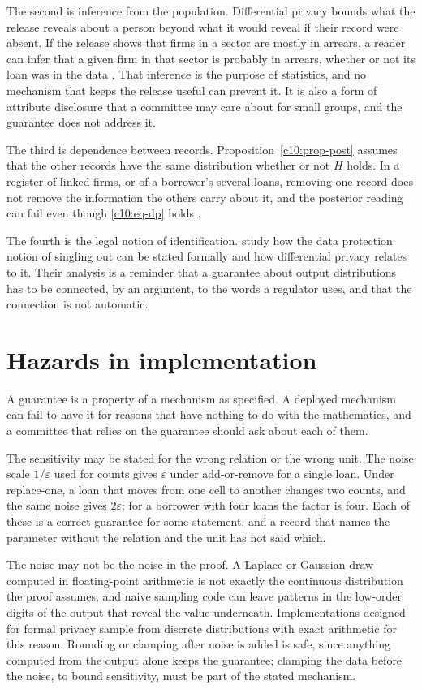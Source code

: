 The second is inference from the population. Differential privacy bounds what the
release reveals about a person beyond what it would reveal if their record were
absent. If the release shows that firms in a sector are mostly in arrears, a reader
can infer that a given firm in that sector is probably in arrears, whether or not
its loan was in the data \citep{dwork2014}. That inference is the purpose of
statistics, and no mechanism that keeps the release useful can prevent it. It is
also a form of attribute disclosure that a committee may care about for small
groups, and the guarantee does not address it.

The third is dependence between records. Proposition~\ref{c10:prop-post} assumes
that the other records have the same distribution whether or not $H$ holds. In a
register of linked firms, or of a borrower's several loans, removing one record
does not remove the information the others carry about it, and the posterior
reading can fail even though \eqref{c10:eq-dp} holds \citep{kifer2011}.

The fourth is the legal notion of identification. \citet{cohen2020} study how the
data protection notion of singling out can be stated formally and how
differential privacy relates to it. Their analysis is a reminder that a
guarantee about output distributions has to be connected, by an argument, to the
words a regulator uses, and that the connection is not automatic.

\section{Hazards in implementation}

A guarantee is a property of a mechanism as specified. A deployed mechanism can
fail to have it for reasons that have nothing to do with the mathematics, and a
committee that relies on the guarantee should ask about each of them.

The sensitivity may be stated for the wrong relation or the wrong unit. The noise
scale $1/\varepsilon$ used for counts gives $\varepsilon$ under add-or-remove for a
single loan. Under replace-one, a loan that moves from one cell to another changes
two counts, and the same noise gives $2\varepsilon$; for a borrower with four loans
the factor is four. Each of these is a correct guarantee for some statement, and a
record that names the parameter without the relation and the unit has not said
which.

The noise may not be the noise in the proof. A Laplace or Gaussian draw computed in
floating-point arithmetic is not exactly the continuous distribution the proof
assumes, and naive sampling code can leave patterns in the low-order digits of the
output that reveal the value underneath. Implementations designed for formal
privacy sample from discrete distributions with exact arithmetic for this reason.
Rounding or clamping after noise is added is safe, since anything computed from
the output alone keeps the guarantee; clamping the data before the noise, to bound
sensitivity, must be part of the stated mechanism.

